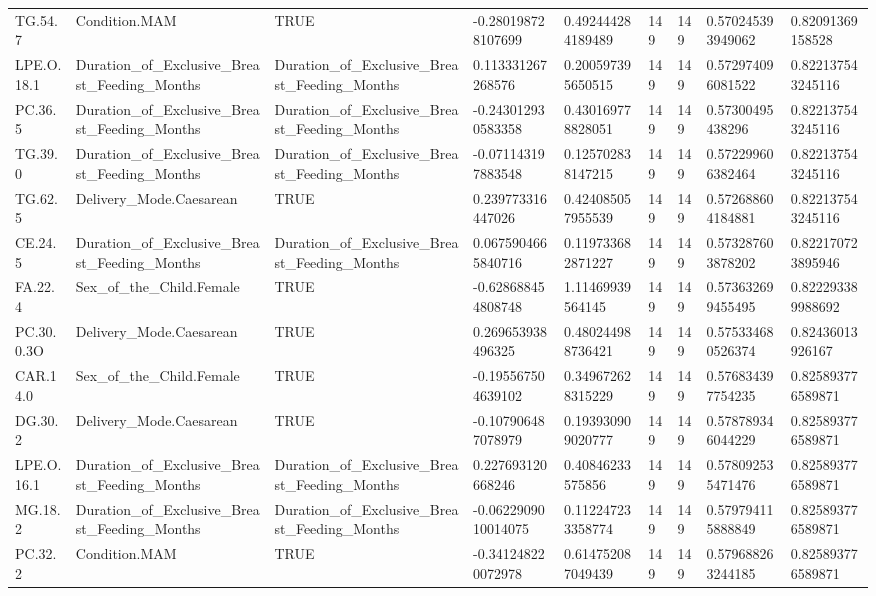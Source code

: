 \begin{longtable}{lllllllll}
TG.54.7 & Condition.MAM & TRUE & -0.280198728107699 & 0.492444284189489 & 149 & 149 & 0.570245393949062 & 0.82091369158528 \\
LPE.O.18.1 & Duration\_of\_Exclusive\_Breast\_Feeding\_Months & Duration\_of\_Exclusive\_Breast\_Feeding\_Months & 0.113331267268576 & 0.200597395650515 & 149 & 149 & 0.572974096081522 & 0.822137543245116 \\
PC.36.5 & Duration\_of\_Exclusive\_Breast\_Feeding\_Months & Duration\_of\_Exclusive\_Breast\_Feeding\_Months & -0.243012930583358 & 0.430169778828051 & 149 & 149 & 0.57300495438296 & 0.822137543245116 \\
TG.39.0 & Duration\_of\_Exclusive\_Breast\_Feeding\_Months & Duration\_of\_Exclusive\_Breast\_Feeding\_Months & -0.071143197883548 & 0.125702838147215 & 149 & 149 & 0.572299606382464 & 0.822137543245116 \\
TG.62.5 & Delivery\_Mode.Caesarean & TRUE & 0.239773316447026 & 0.424085057955539 & 149 & 149 & 0.572688604184881 & 0.822137543245116 \\
CE.24.5 & Duration\_of\_Exclusive\_Breast\_Feeding\_Months & Duration\_of\_Exclusive\_Breast\_Feeding\_Months & 0.0675904665840716 & 0.119733682871227 & 149 & 149 & 0.573287603878202 & 0.822170723895946 \\
FA.22.4 & Sex\_of\_the\_Child.Female & TRUE & -0.628688454808748 & 1.11469939564145 & 149 & 149 & 0.573632699455495 & 0.822293389988692 \\
PC.30.0.3O & Delivery\_Mode.Caesarean & TRUE & 0.269653938496325 & 0.480244988736421 & 149 & 149 & 0.575334680526374 & 0.82436013926167 \\
CAR.14.0 & Sex\_of\_the\_Child.Female & TRUE & -0.195567504639102 & 0.349672628315229 & 149 & 149 & 0.576834397754235 & 0.825893776589871 \\
DG.30.2 & Delivery\_Mode.Caesarean & TRUE & -0.107906487078979 & 0.193930909020777 & 149 & 149 & 0.578789346044229 & 0.825893776589871 \\
LPE.O.16.1 & Duration\_of\_Exclusive\_Breast\_Feeding\_Months & Duration\_of\_Exclusive\_Breast\_Feeding\_Months & 0.227693120668246 & 0.40846233575856 & 149 & 149 & 0.578092535471476 & 0.825893776589871 \\
MG.18.2 & Duration\_of\_Exclusive\_Breast\_Feeding\_Months & Duration\_of\_Exclusive\_Breast\_Feeding\_Months & -0.0622909010014075 & 0.112247233358774 & 149 & 149 & 0.579794115888849 & 0.825893776589871 \\
PC.32.2 & Condition.MAM & TRUE & -0.341248220072978 & 0.614752087049439 & 149 & 149 & 0.579688263244185 & 0.825893776589871 \\

\end{longtable}
